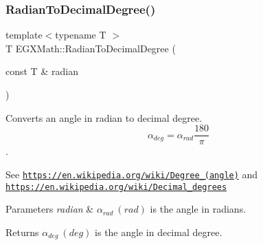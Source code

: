 \subsubsection{\texorpdfstring{Radian\+To\+Decimal\+Degree()}{RadianToDecimalDegree()}}
{\footnotesize\ttfamily template$<$typename T $>$ \\
T E\+G\+X\+Math\+::\+Radian\+To\+Decimal\+Degree (\begin{DoxyParamCaption}\item[{const T \&}]{radian }\end{DoxyParamCaption})}



Converts an angle in radian to decimal degree. \[\alpha_{deg}=\alpha_{rad}\frac{180}{\pi}\]. 

See \href{https://en.wikipedia.org/wiki/Degree_(angle)}{\tt https\+://en.\+wikipedia.\+org/wiki/\+Degree\+\_\+(angle)} and \href{https://en.wikipedia.org/wiki/Decimal_degrees}{\tt https\+://en.\+wikipedia.\+org/wiki/\+Decimal\+\_\+degrees} 
\begin{DoxyParams}{Parameters}
{\em radian} & $\alpha_{rad}\ (rad)$ is the angle in radians. \\
\hline
\end{DoxyParams}
\begin{DoxyReturn}{Returns}
$\alpha_{deg}\ (deg)$ is the angle in decimal degree. 
\end{DoxyReturn}

